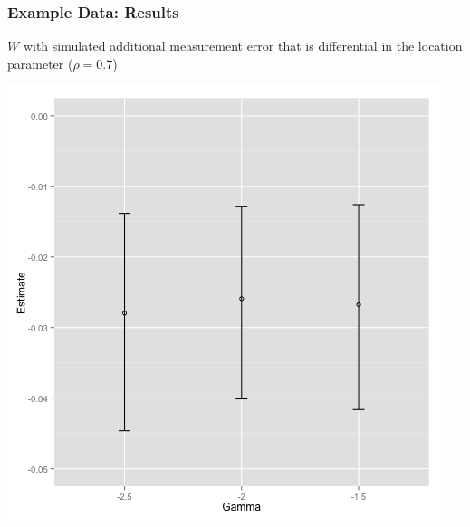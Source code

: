 \documentclass{beamer}
\begin{document}
\begin{frame}

\frametitle{ Example Data: Results}

$W$ with simulated additional measurement error that is differential in the location parameter ($\rho=0.7$)

\centering
\includegraphics[width=\textwidth,height=0.7\textheight,keepaspectratio]{gammarealdatamini}

 

\end{frame} 
\end{document}
